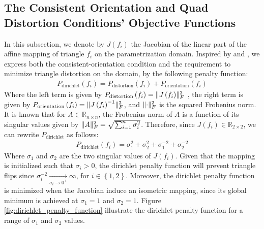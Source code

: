 \subsection{The Consistent Orientation and Quad Distortion Conditions' Objective Functions}
In this subsection, we denote by $J\left(f_i\right)$ the Jacobian of the linear part of the affine mapping of triangle $f_i$ on the parametrization domain. Inspired by \cite{Smith:2015} and \cite{Poranne:Autocuts:2017}, we express both the consistent-orientation condition and the requirement to minimize triangle distortion on the domain, by the following penalty function:
\begin{equation}\label{eq:orientation_and_distortion_penalty}
\begin{split}
P_{\mathrm{dirichlet}}\left(f_i\right) = P_{\mathrm{distortion}}\left(f_i\right) + P_{\mathrm{orientation}}\left(f_i\right)
\end{split}
\end{equation}
Where the left term is given by $P_{\mathrm{distortion}}\left(f_i\right) = \lVert J\left(f_i\right)\rVert_F^2$ , the right term is given by $P_{\mathrm{orientation}}\left(f_i\right) = \lVert J\left(f_i\right)^{-1}\rVert_F^2$, and $\lVert\cdot\rVert_F^2$ is the squared Frobenius norm. It is known that for $A \in \mathbb{R}_{n \times n}$, the Frobenius norm of $A$ is a function of its singular values given by $\lVert A\rVert_F^2 = \sqrt{\sum_{i=1}^{n} \sigma_i^2}$. Therefore, since $J\left(f_i\right) \in \mathbb{R}_{2 \times 2}$, we can rewrite $P_{\mathrm{dirichlet}}$ as follows:
\begin{equation}\label{eq:orientation_and_distortion_penalty_explicit}
\begin{split}
P_{\mathrm{dirichlet}}\left(f_i\right) = \sigma^2_1 + \sigma^2_2 + \sigma^{-2}_1 +\sigma^{-2}_2
\end{split}
\end{equation}
Where $\sigma_1$ and $\sigma_2$ are the two singular values of $J\left(f_i\right)$. Given that the mapping is initialized such that $\sigma_i > 0$, the dirichlet penalty function will prevent triangle flips since $\sigma^{-2}_i \xrightarrow[\sigma_i \to 0^+]{} \infty$, for $i \in \left\{1,2\right\}$. Moreover, the dirichlet penalty function is minimized when the Jacobian induce an isometric mapping, since its global minimum is achieved at $\sigma_1 = 1$ and $\sigma_2 = 1$. Figure \ref{fig:dirichlet_penalty_function} illustrate the dirichlet penalty function for a range of $\sigma_1$ and $\sigma_2$ values.
